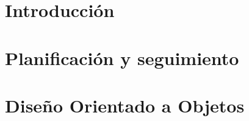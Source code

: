 \documentclass[hidelinks,a4paper,11pt, nofootinbib]{article}
\begin{document}
\maketitle

\tableofcontents
\newpage

\section{Introducción}

\newpage

\section{Planificación y seguimiento}

\newpage

\section{Diseño Orientado a Objetos}

\newpage
\end{document}
